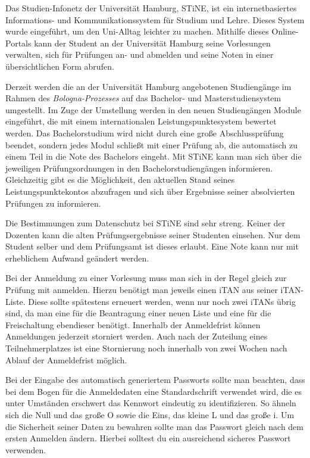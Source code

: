 Das Studien-Infonetz der Universität Hamburg, STiNE, ist ein internetbasiertes
Informations- und Kommunikationssystem für Studium und Lehre. Dieses System
wurde eingeführt, um den Uni-Alltag leichter zu machen. Mithilfe dieses
Online-Portals kann der Student an der Universität Hamburg seine Vorlesungen
verwalten, sich für Prüfungen an- und abmelden und seine Noten in einer
übersichtlichen Form abrufen.

Derzeit werden die an der Universität Hamburg angebotenen Studiengänge im
Rahmen des \emph{Bologna-Prozesses} auf das Bachelor- und Masterstudiensystem
umgestellt. Im Zuge der Umstellung werden in den neuen Studiengängen Module
eingeführt, die mit einem internationalen Leistungspunktesystem bewertet
werden. Das Bachelorstudium wird nicht durch eine große Abschlussprüfung
beendet, sondern jedes Modul schließt mit einer Prüfung ab, die automatisch zu
einem Teil in die Note des Bachelors eingeht. Mit STiNE kann man sich über die
jeweiligen Prüfungsordnungen in den Bachelorstudiengängen informieren.
Gleichzeitig gibt es die Möglichkeit, den aktuellen Stand seines
Leistungspunktekontos abzufragen und sich über Ergebnisse seiner absolvierten
Prüfungen zu informieren.

Die Bestimmungen zum Datenschutz bei STiNE sind sehr streng. Keiner der
Dozenten kann die alten Prüfungsergebnisse seiner Studenten einsehen. Nur dem
Student selber und dem Prüfungsamt ist dieses erlaubt. Eine Note kann nur mit
erheblichem Aufwand geändert werden.

Bei der Anmeldung zu einer Vorlesung muss man sich in der Regel gleich zur
Prüfung mit anmelden. Hierzu benötigt man jeweils einen iTAN aus seiner
iTAN-Liste. Diese sollte spätestens erneuert werden, wenn nur noch zwei iTANs
übrig sind, da man eine für die Beantragung einer neuen Liste und eine für die
Freischaltung ebendieser benötigt.  Innerhalb der Anmeldefrist können
Anmeldungen jederzeit storniert werden. Auch nach der Zuteilung eines
Teilnehmerplatzes ist eine Stornierung noch innerhalb von zwei Wochen nach
Ablauf der Anmeldefrist möglich.

Bei der Eingabe des automatisch generiertem Passworts sollte man beachten, dass
bei dem Bogen für die Anmeldedaten eine Standardschrift verwendet wird, die es
unter Umständen erschwert das Kennwort eindeutig zu identifizieren. So ähneln
sich die Null und das große O sowie die Eins, das kleine L und das große i. Um
die Sicherheit seiner Daten zu bewahren sollte man das Passwort gleich nach dem
ersten Anmelden ändern. Hierbei solltest du ein ausreichend sicheres Passwort
verwenden.

